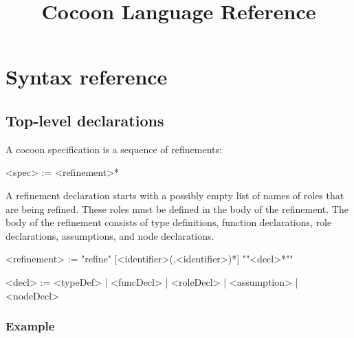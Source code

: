 \documentclass{report}
\title{Cocoon Language Reference}
\newcommand{\comment}[1]{{\textit{\textbf{#1}}}}
\begin{document}
\maketitle

\tableofcontents



\chapter{Syntax reference}\label{s:reference}

\section{Top-level declarations}

A cocoon specification is a sequence of refinements:
\begin{bnflisting}{}
<spec> := <refinement>*
\end{bnflisting}

A refinement declaration starts with a possibly empty list of names of roles that 
are being refined.  These roles must be defined in the body of the refinement.
The body of the refinement consists of type definitions, function declarations,
role declarations, assumptions, and node declarations.
\begin{bnflisting}{}
<refinement> := "refine" [<identifier>(,<identifier>)*] 
                "{"<decl>*"}"

<decl> := <typeDef>
        | <funcDecl>
        | <roleDecl>
        | <assumption>
        | <nodeDecl>
\end{bnflisting}

\subsection*{Example}
\end{document}
